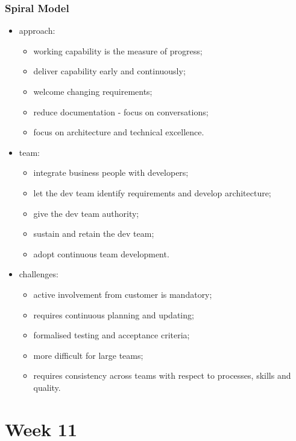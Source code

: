 \documentclass[journal]{IEEEtran}
\begin{document}
\subsubsection{Spiral Model}
\begin{itemize}
	\item approach:
	\begin{itemize}
		\item working capability is the measure of progress;
		\item deliver capability early and continuously;
		\item welcome changing requirements;
		\item reduce documentation - focus on conversations;
		\item focus on architecture and technical excellence.
	\end{itemize}
	\item team:
	\begin{itemize}
		\item integrate business people with developers;
		\item let the dev team identify requirements and develop architecture;
		\item give the dev team authority;
		\item sustain and retain the dev team;
		\item adopt continuous team development.
	\end{itemize}
	\item challenges:
	\begin{itemize}
		\item active involvement from customer is mandatory;
		\item requires continuous planning and updating;
		\item formalised testing and acceptance criteria;
		\item more difficult for large teams;
		\item requires consistency across teams with respect to processes, skills and quality.
	\end{itemize}
\end{itemize}

\section{Week 11}
\end{document}
